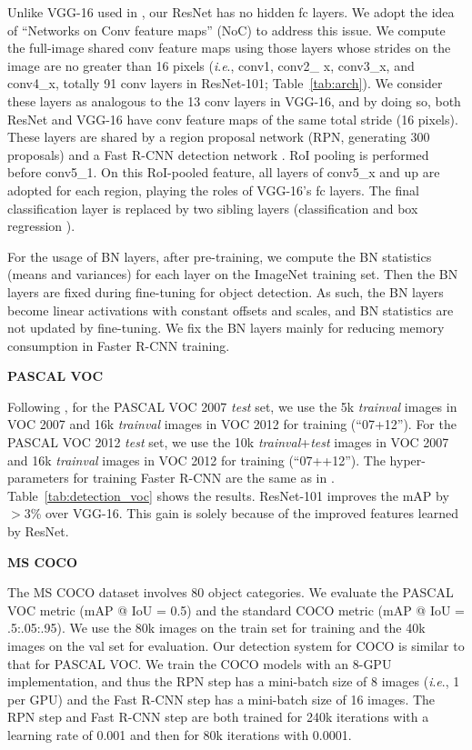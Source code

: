 \documentclass{article}
\newcommand{\ie}{\textit{i}.\textit{e}.}
\begin{document}
Unlike VGG-16 used in \cite{Ren2015}, our ResNet has no hidden fc layers. We adopt the idea of ``Networks on Conv feature maps'' (NoC) \cite{Ren2015a} to address this issue.
We compute the full-image shared conv feature maps using those layers whose strides on the image are no greater than 16 pixels (\ie, conv1, conv2\_ x, conv3\_x, and conv4\_x, totally 91 conv layers in ResNet-101; Table~\ref{tab:arch}). We consider these layers as analogous to the 13 conv layers in VGG-16, and by doing so, both ResNet and VGG-16 have conv feature maps of the same total stride (16 pixels).
These layers are shared by a region proposal network (RPN, generating 300 proposals) \cite{Ren2015} and a Fast R-CNN detection network \cite{Girshick2015}.
RoI pooling \cite{Girshick2015} is performed before conv5\_1. On this RoI-pooled feature, all layers of conv5\_x and up are adopted for each region, playing the roles of VGG-16's fc layers.
The final classification layer is replaced by two sibling layers (classification and box regression \cite{Girshick2015}).

For the usage of BN layers, after pre-training, we compute the BN statistics (means and variances) for each layer on the ImageNet training set. Then the BN layers are fixed during fine-tuning for object detection. As such, the BN layers become linear activations with constant offsets and scales, and BN statistics are not updated by fine-tuning. We fix the BN layers mainly for reducing memory consumption in Faster R-CNN training.


\vspace{.5em}
\noindent\textbf{PASCAL VOC}

Following \cite{Girshick2015,Ren2015}, for the PASCAL VOC 2007 \emph{test} set, we use the 5k \emph{trainval} images in VOC 2007 and 16k \emph{trainval} images in VOC 2012 for training (``07+12''). For the PASCAL VOC 2012 \emph{test} set, we use the 10k \emph{trainval}+\emph{test} images in VOC 2007 and 16k \emph{trainval} images in VOC 2012 for training (``07++12''). The hyper-parameters for training Faster R-CNN are the same as in \cite{Ren2015}.
Table~\ref{tab:detection_voc} shows the results. ResNet-101 improves the mAP by $>$3\% over VGG-16. This gain is solely because of the improved features learned by ResNet.



\vspace{.5em}
\noindent\textbf{MS COCO}

The MS COCO dataset \cite{Lin2014} involves 80 object categories. We evaluate the PASCAL VOC metric (mAP @ IoU = 0.5) and the standard COCO metric (mAP @ IoU = .5:.05:.95). We use the 80k images on the train set for training and the 40k images on the val set for evaluation.
Our detection system for COCO is similar to that for PASCAL VOC.
We train the COCO models with an 8-GPU implementation, and thus the RPN step has a mini-batch size of 8 images (\ie, 1 per GPU) and the Fast R-CNN step has a mini-batch size of 16 images. The RPN step and Fast R-CNN step are both trained for 240k iterations with a learning rate of 0.001 and then for 80k iterations with 0.0001.
\end{document}
